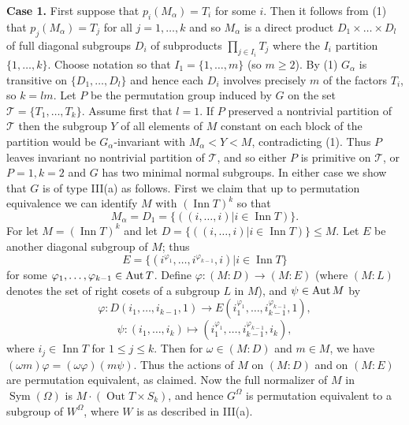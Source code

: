 \textbf{Case 1.} First suppose that $p_i(M_\alpha) = T_i$ for some $i$. Then it follows from (1) that $p_j(M_\alpha) = T_j$ for all $j=1, \dots, k$ and so $M_\alpha$ is a direct product $D_1 \times \dots \times D_l$ of full diagonal subgroups $D_i$ of subproducts $\prod_{j \in I_i} T_j$ where the $I_i$ partition $\{1, \dots, k\}$.
Choose notation so that $I_1 = \{1, \dots, m\}$ (so $m \ge 2$). By (1) $G_\alpha$ is transitive on $\{D_1, \dots, D_l\}$ and hence each $D_i$ involves precisely $m$ of the factors $T_i$, so $k=lm$. Let $P$ be the permutation group induced by $G$ on the set $\mathcal{T} = \{T_1, \dots, T_k\}$. Assume first that $l=1$. If $P$ preserved a nontrivial partition of $\mathcal{T}$ then the subgroup $Y$ of all elements of $M$ constant on each block of the partition would be $G_\alpha$-invariant with $M_\alpha < Y < M$, contradicting (1). Thus $P$ leaves invariant no nontrivial partition of $\mathcal{T}$, and so either $P$ is primitive on $\mathcal{T}$, or $P=1, k=2$ and $G$ has two minimal normal subgroups. In either case we show that $G$ is of type III(a) as follows. First we claim that up to permutation equivalence we can identify $M$ with $(\operatorname{Inn} T)^k$ so that
$$M_\alpha = D_1 = \{ ((i, \dots, i) | i \in \operatorname{Inn} T) \}. $$
For let $M = (\operatorname{Inn} T)^k$ and let $D = \{((i, \dots, i) | i \in \operatorname{Inn} T) \} \le M$. Let $E$ be another diagonal subgroup of $M$; thus
$$E = \{ (i^{\varphi_1}, \dots, i^{\varphi_{k-1}}, i) | i \in \operatorname{Inn} T \} $$
for some $\varphi_1, \dots, \varphi_{k-1} \in \operatorname{Aut} T$. Define $\varphi: (M:D) \to (M:E)$ (where $(M:L)$ denotes the set of right cosets of a subgroup $L$ in $M$), and $\psi \in \operatorname{Aut} M$ by
$$ \varphi: D(i_1, \dots, i_{k-1}, 1) \to E(i_1^{\varphi_1}, \dots, i_{k-1}^{\varphi_{k-1}}, 1), $$
$$ \psi: (i_1, \dots, i_k) \mapsto (i_1^{\varphi_1}, \dots, i_{k-1}^{\varphi_{k-1}}, i_k), $$
where $i_j \in \operatorname{Inn} T$ for $1 \le j \le k$. Then for $\omega \in (M:D)$ and $m \in M$, we have $(\omega m)\varphi = (\omega \varphi)(m \psi)$. Thus the actions of $M$ on $(M:D)$ and on $(M:E)$ are permutation equivalent, as claimed. Now the full normalizer of $M$ in $\operatorname{Sym}(\Omega)$ is $M \cdot (\operatorname{Out} T \times S_k)$, and hence $G^\Omega$ is permutation equivalent to a subgroup of $W^\Omega$, where $W$ is as described in III(a).

